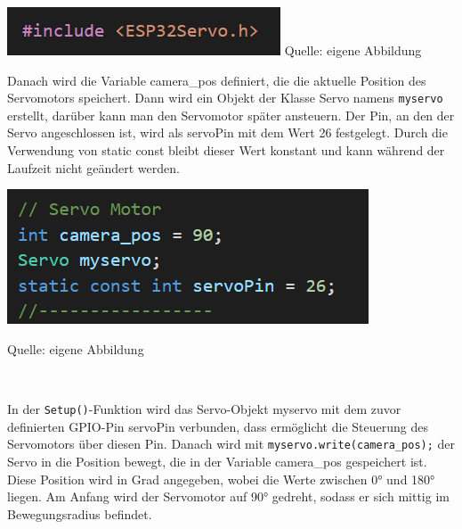 \documentclass[ngerman,12pt,a4paper]{article}
\begin{document}
				\begin{center}
					\begin{minipage}{0.7\textwidth}
						\centering
						\includegraphics[width=\textwidth]{Pictures/esp32servo}
						\label{fig:esp32sero}
						\vspace{5pt}
						{\small {Quelle: eigene Abbildung}}
					\end{minipage}
				\end{center}
				Danach wird die Variable camera\_pos definiert, die die aktuelle Position des Servomotors speichert. Dann wird ein Objekt der Klasse Servo namens \texttt{myservo} erstellt, darüber kann man den Servomotor später ansteuern. Der Pin, an den der Servo angeschlossen ist, wird als servoPin mit dem Wert 26 festgelegt. Durch die Verwendung von static const bleibt dieser Wert konstant und kann während der Laufzeit nicht geändert werden.
				
				\begin{center}
					\begin{minipage}{1\textwidth}
						\centering
						\includegraphics{Pictures/servopins}
						\label{fig:servopins}
						\vspace{-10pt}
						\begin{center}
							\par\small Quelle: eigene Abbildung 
						\end{center}
					\end{minipage} \\[0.70cm]
				\end{center}
				In der \texttt{Setup()}-Funktion wird das Servo-Objekt myservo mit dem zuvor definierten GPIO-Pin servoPin verbunden, dass ermöglicht die Steuerung des Servomotors über diesen Pin. Danach wird mit \texttt{myservo.write(camera\_pos);} der Servo in die Position bewegt, die in der Variable camera\_pos gespeichert ist. Diese Position wird in Grad angegeben, wobei die Werte zwischen 0° und 180° liegen. Am Anfang wird der Servomotor auf 90° gedreht, sodass er sich mittig im Bewegungsradius befindet.
				
\end{document}
